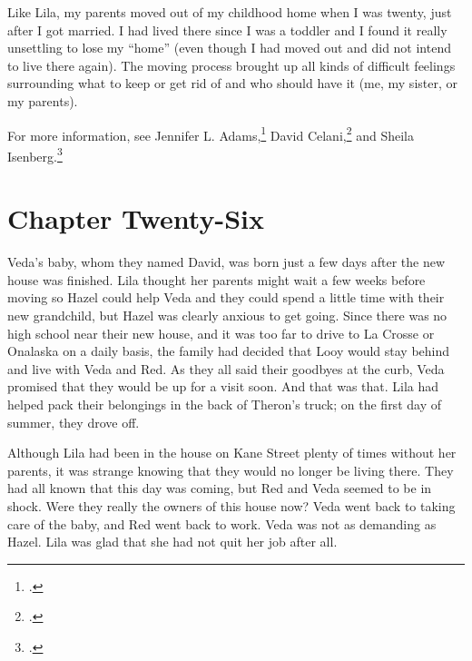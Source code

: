 \documentclass[
  american,
  letterpaper,
]{book}
\begin{document}
Like Lila, my parents moved out of my childhood home when I was twenty,
just after I got married. I had lived there since I was a toddler and I
found it really unsettling to lose my ``home'' (even though I had moved
out and did not intend to live there again). The moving process brought
up all kinds of difficult feelings surrounding what to keep or get rid
of and who should have it (me, my sister, or my parents).

For more information, see Jennifer L. Adams,\footnote{.} David
Celani,\footnote{.} and Sheila Isenberg.\footnote{.}


\chapter{Chapter Twenty-Six}\label{chapter-twenty-six}

Veda's baby, whom they named David, was born just a few days after the
new house was finished. Lila thought her parents might wait a few weeks
before moving so Hazel could help Veda and they could spend a little
time with their new grandchild, but Hazel was clearly anxious to get
going. Since there was no high school near their new house, and it was
too far to drive to La Crosse or Onalaska on a daily basis, the family
had decided that Looy would stay behind and live with Veda and Red. As
they all said their goodbyes at the curb, Veda promised that they would
be up for a visit soon. And that was that. Lila had helped pack their
belongings in the back of Theron's truck; on the first day of summer,
they drove off.

Although Lila had been in the house on Kane Street plenty of times
without her parents, it was strange knowing that they would no longer be
living there. They had all known that this day was coming, but Red and
Veda seemed to be in shock. Were they really the owners of this house
now? Veda went back to taking care of the baby, and Red went back to
work. Veda was not as demanding as Hazel. Lila was glad that she had not
quit her job after all.
\end{document}
